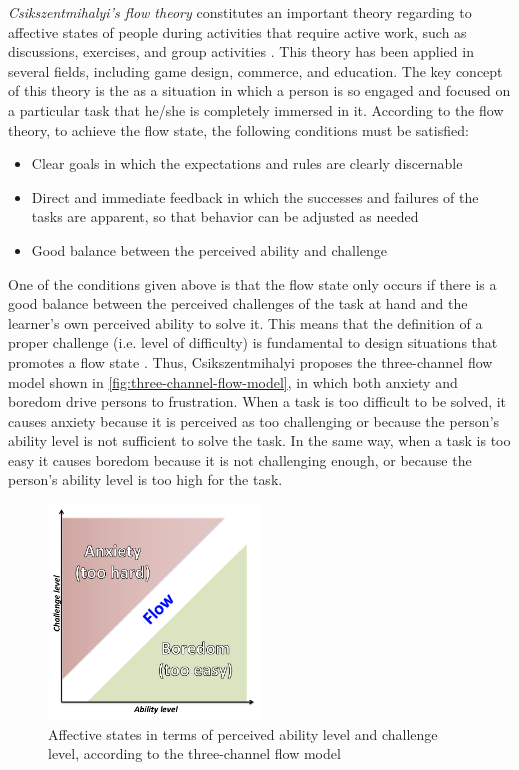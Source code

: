 \emph{Csikszentmihalyi’s flow theory} constitutes an important theory regarding to affective states of people during activities that require active work, such as discussions, exercises, and group activities \cite{Csikszentmihalyi2014,SnyderLopezPedrotti2010}.
This theory has been applied in several fields, including game design, commerce, and education.
The key concept of this theory is the  as a situation in which a person is so engaged and focused on a particular task that he/she is completely immersed in it.
According to the flow theory, to achieve the flow state, the following conditions must be satisfied:

\begin{itemize}
\item Clear goals in which the expectations and rules are clearly discernable
\item Direct and immediate feedback in which the successes and failures of the tasks are apparent, so that behavior can be adjusted as needed
\item Good balance between the perceived ability and challenge
\end{itemize}

One of the conditions given above is that the flow state only occurs if there is a good balance between the perceived challenges of the task at hand and the learner’s own perceived ability to solve it. This means that the definition of a proper challenge (i.e. level of difficulty) is fundamental to design situations that promotes a flow state \cite{LinehanBellordKirmanMorfordRoche2014}.
Thus, Csikszentmihalyi proposes the three-channel flow model \cite{Csikszentmihalyi2008} shown in \autoref{fig:three-channel-flow-model}, in which both anxiety and boredom drive persons to frustration.
When a task is too difficult to be solved, it causes anxiety because it is perceived as too challenging or because the person’s ability level is not sufficient to solve the task.
In the same way, when a task is too easy it causes boredom because it is not challenging enough, or because the person’s ability level is too high for the task.

 \begin{figure}[htb]
 \caption{Affective states in terms of perceived ability level and challenge level, according to the three-channel flow model}
 \label{fig:three-channel-flow-model}
 \centering
 \includegraphics[width=0.5\textwidth]{images/chap-model-gmif/three-channel-flow-model.png}
\end{figure}

